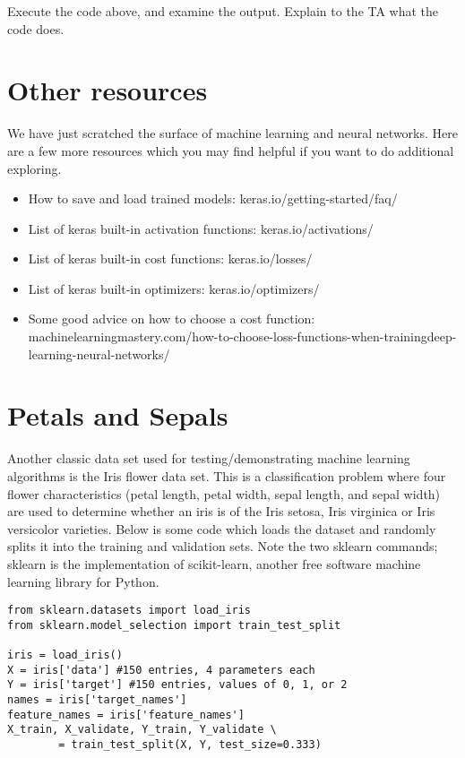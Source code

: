 \begin{problem}\label{P13.4} Execute the code above, and examine the output. Explain to the TA what
the code does.\end{problem}

\section*{Other resources}

We have just scratched the surface of machine learning and neural networks. Here are a few more resources which you may find helpful if you want to do additional exploring.
\begin{itemize}
\item How to save and load trained models: keras.io/getting-started/faq/
\item List of keras built-in activation functions: keras.io/activations/
\item List of keras built-in cost functions: keras.io/losses/
\item List of keras built-in optimizers: keras.io/optimizers/
\item Some good advice on how to choose a cost function: machinelearningmastery.com/how-to-choose-loss-functions-when-trainingdeep-learning-neural-networks/

\end{itemize}

\section*{Petals and Sepals}
Another classic data set used for testing/demonstrating machine learning algorithms is the Iris flower data set. This is a classification problem where four flower
characteristics (petal length, petal width, sepal length, and sepal width) are used
to determine whether an iris is of the Iris setosa, Iris virginica or Iris versicolor
varieties. Below is some code which loads the dataset and randomly splits it
into the training and validation sets. Note the two sklearn commands; sklearn
is the implementation of scikit-learn, another free software machine learning
library for Python.

\begin{lstlisting}
from sklearn.datasets import load_iris
from sklearn.model_selection import train_test_split

iris = load_iris()
X = iris['data'] #150 entries, 4 parameters each
Y = iris['target'] #150 entries, values of 0, 1, or 2
names = iris['target_names']
feature_names = iris['feature_names']
X_train, X_validate, Y_train, Y_validate \
		= train_test_split(X, Y, test_size=0.333)

\end{lstlisting}

